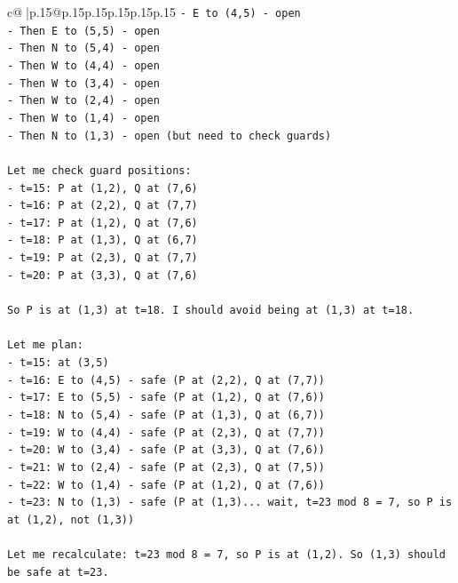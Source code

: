 \documentclass{article}
\begin{document}
{\begin{supertabular}{c@{$\;$}|p{.15\linewidth}@{}p{.15\linewidth}p{.15\linewidth}p{.15\linewidth}p{.15\linewidth}p{.15\linewidth}}
{{{\texttt{{-} E to (4,5) {-} open} \\
\texttt{{-} Then E to (5,5) {-} open} \\
\texttt{{-} Then N to (5,4) {-} open} \\
\texttt{{-} Then W to (4,4) {-} open} \\
\texttt{{-} Then W to (3,4) {-} open} \\
\texttt{{-} Then W to (2,4) {-} open} \\
\texttt{{-} Then W to (1,4) {-} open} \\
\texttt{{-} Then N to (1,3) {-} open (but need to check guards)} \\
\\ 
\texttt{Let me check guard positions:} \\
\texttt{{-} t=15: P at (1,2), Q at (7,6)} \\
\texttt{{-} t=16: P at (2,2), Q at (7,7)} \\
\texttt{{-} t=17: P at (1,2), Q at (7,6)} \\
\texttt{{-} t=18: P at (1,3), Q at (6,7)} \\
\texttt{{-} t=19: P at (2,3), Q at (7,7)} \\
\texttt{{-} t=20: P at (3,3), Q at (7,6)} \\
\\ 
\texttt{So P is at (1,3) at t=18. I should avoid being at (1,3) at t=18.} \\
\\ 
\texttt{Let me plan:} \\
\texttt{{-} t=15: at (3,5)} \\
\texttt{{-} t=16: E to (4,5) {-} safe (P at (2,2), Q at (7,7))} \\
\texttt{{-} t=17: E to (5,5) {-} safe (P at (1,2), Q at (7,6))} \\
\texttt{{-} t=18: N to (5,4) {-} safe (P at (1,3), Q at (6,7))} \\
\texttt{{-} t=19: W to (4,4) {-} safe (P at (2,3), Q at (7,7))} \\
\texttt{{-} t=20: W to (3,4) {-} safe (P at (3,3), Q at (7,6))} \\
\texttt{{-} t=21: W to (2,4) {-} safe (P at (2,3), Q at (7,5))} \\
\texttt{{-} t=22: W to (1,4) {-} safe (P at (1,2), Q at (7,6))} \\
\texttt{{-} t=23: N to (1,3) {-} safe (P at (1,3)... wait, t=23 mod 8 = 7, so P is at (1,2), not (1,3))} \\
\\ 
\texttt{Let me recalculate: t=23 mod 8 = 7, so P is at (1,2). So (1,3) should be safe at t=23.} \\
}}}
\end{supertabular}}
\end{document}
